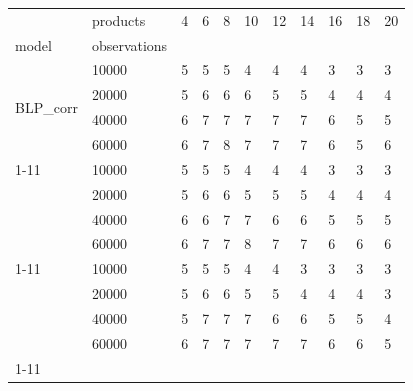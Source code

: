 \begin{tabular}{lllllllllll}
\toprule
 & products & 4 & 6 & 8 & 10 & 12 & 14 & 16 & 18 & 20 \\
model & observations &  &  &  &  &  &  &  &  &  \\
\midrule
\multirow[t]{4}{*}{BLP_corr} & 10000 & 5 & 5 & 5 & 4 & 4 & 4 & 3 & 3 & 3 \\
 & 20000 & 5 & 6 & 6 & 6 & 5 & 5 & 4 & 4 & 4 \\
 & 40000 & 6 & 7 & 7 & 7 & 7 & 7 & 6 & 5 & 5 \\
 & 60000 & 6 & 7 & 8 & 7 & 7 & 7 & 6 & 5 & 6 \\
\cline{1-11}
\multirow[t]{4}{*}{BLP_ind} & 10000 & 5 & 5 & 5 & 4 & 4 & 4 & 3 & 3 & 3 \\
 & 20000 & 5 & 6 & 6 & 5 & 5 & 5 & 4 & 4 & 4 \\
 & 40000 & 6 & 6 & 7 & 7 & 6 & 6 & 5 & 5 & 5 \\
 & 60000 & 6 & 7 & 7 & 8 & 7 & 7 & 6 & 6 & 6 \\
\cline{1-11}
\multirow[t]{4}{*}{Logit} & 10000 & 5 & 5 & 5 & 4 & 4 & 3 & 3 & 3 & 3 \\
 & 20000 & 5 & 6 & 6 & 5 & 5 & 4 & 4 & 4 & 3 \\
 & 40000 & 5 & 7 & 7 & 7 & 6 & 6 & 5 & 5 & 4 \\
 & 60000 & 6 & 7 & 7 & 7 & 7 & 7 & 6 & 6 & 5 \\
\cline{1-11}
\bottomrule
\end{tabular}
